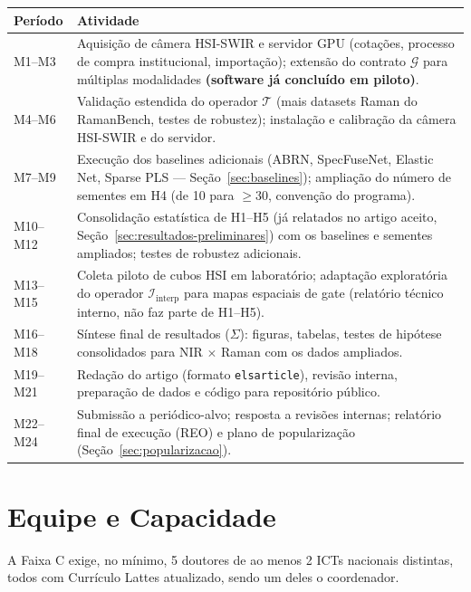 \documentclass[11pt,a4paper]{article}
\begin{document}
\begin{center}
\begin{tabular}{p{2.2cm}p{11.9cm}}
\toprule
Período & Atividade \\
\midrule
M1--M3 & Aquisição de câmera HSI-SWIR e servidor GPU (cotações, processo de compra institucional, importação); extensão do contrato $\mathcal{G}$ para múltiplas modalidades \textbf{(software já concluído em piloto)}. \\
M4--M6 & Validação estendida do operador $\mathcal{T}$ (mais datasets Raman do RamanBench, testes de robustez); instalação e calibração da câmera HSI-SWIR e do servidor. \\
M7--M9 & Execução dos baselines adicionais (ABRN, SpecFuseNet, Elastic Net, Sparse PLS --- Seção~\ref{sec:baselines}); ampliação do número de sementes em H4 (de 10 para $\geq 30$, convenção do programa). \\
M10--M12 & Consolidação estatística de H1--H5 (já relatados no artigo aceito, Seção~\ref{sec:resultados-preliminares}) com os baselines e sementes ampliados; testes de robustez adicionais. \\
M13--M15 & Coleta piloto de cubos HSI em laboratório; adaptação exploratória do operador $\mathcal{I}_{\text{interp}}$ para mapas espaciais de gate (relatório técnico interno, não faz parte de H1--H5). \\
M16--M18 & Síntese final de resultados ($\Sigma$): figuras, tabelas, testes de hipótese consolidados para NIR $\times$ Raman com os dados ampliados. \\
M19--M21 & Redação do artigo (formato \texttt{elsarticle}), revisão interna, preparação de dados e código para repositório público. \\
M22--M24 & Submissão a periódico-alvo; resposta a revisões internas; relatório final de execução (REO) e plano de popularização (Seção~\ref{sec:popularizacao}). \\
\bottomrule
\end{tabular}
\end{center}

\section{Equipe e Capacidade}
\label{sec:equipe}

A Faixa C exige, no mínimo, 5 doutores de ao menos 2 ICTs nacionais distintas, todos com Currículo Lattes atualizado, sendo um deles o coordenador.
\end{document}
